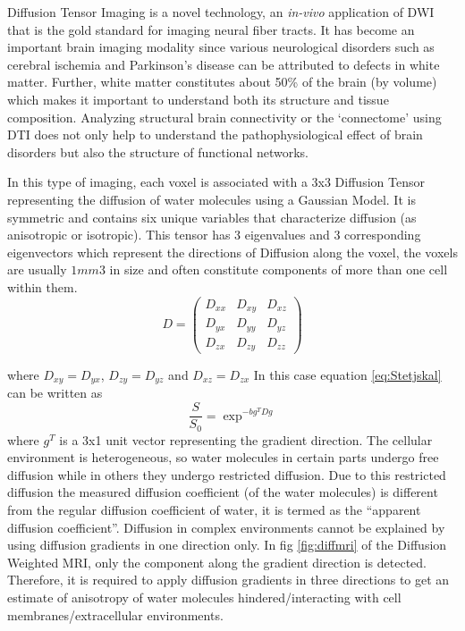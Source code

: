 \documentclass[msthesis.tex]{subfiles}
\begin{document}
Diffusion Tensor Imaging is a novel technology, an \textit{in-vivo } application of DWI that is the gold standard for imaging neural fiber tracts. It has become an important brain imaging modality since various neurological disorders such as cerebral ischemia and Parkinson’s disease can be attributed to defects in white matter. Further, white matter constitutes about 50\% of the brain (by volume) which makes it important to understand both its structure and tissue composition. Analyzing structural brain connectivity or the ‘connectome’ using DTI does not only help to understand the pathophysiological effect of brain disorders but also the structure of functional networks.

In this type of imaging, each voxel is associated with a 3x3 Diffusion Tensor representing the diffusion of water molecules using a Gaussian Model. It is symmetric and contains six unique variables that characterize diffusion (as anisotropic or isotropic). This tensor has 3 eigenvalues and 3 corresponding eigenvectors which represent the directions of Diffusion along the voxel, the voxels are usually $1 mm3$ in size and often constitute components of more than one cell within them.
\begin{equation*}
D =
\begin{pmatrix}
D_{xx} & D_{xy} & D_{xz} \\
D_{yx} & D_{yy} & D_{yz} \\
D_{zx} & D_{zy} & D_{zz}
\end{pmatrix}  
\end{equation*}

where $D_{xy} = D_{yx}$, $D_{zy}=D_{yz}$ and $D_{xz}=D_{zx}$
In this case equation \ref{eq:Stetjskal} can be written as 
\begin{equation}
\frac{S}{S_0} =  \exp^{-bg^T Dg}
\end{equation}where $g^T$ is a 3x1 unit vector representing the gradient direction.
The cellular environment is heterogeneous, so water molecules in certain parts undergo free diffusion while in others they undergo restricted diffusion. Due to this restricted diffusion the measured diffusion coefficient (of the water molecules) is different from the regular diffusion coefficient of water, it is termed as the “apparent diffusion coefficient”. Diffusion in complex environments cannot be explained by using diffusion gradients in one direction only. In fig \ref{fig:diffmri} of the Diffusion Weighted MRI, only the component along the gradient direction is detected. Therefore, it is required to apply diffusion gradients in three directions to get an estimate of anisotropy of water molecules hindered/interacting with cell membranes/extracellular environments. 
\end{document}
